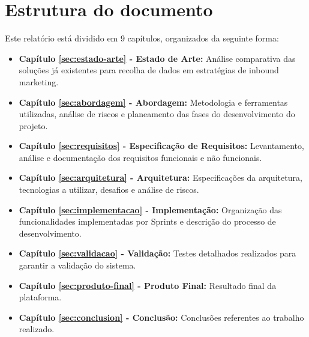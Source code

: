 \section{Estrutura do documento}
\label{subsec:estrutura}

Este relatório está dividido em 9 capítulos, organizados da seguinte forma:
\begin{itemize}
	 \item \textbf{Capítulo \ref{sec:estado-arte} - Estado de Arte: }Análise comparativa das soluções já existentes para recolha de dados em estratégias de inbound marketing.
	
	\item \textbf{Capítulo \ref{sec:abordagem} - Abordagem: }Metodologia e ferramentas utilizadas, análise de riscos e planeamento das fases do desenvolvimento do projeto.
	
	\item \textbf{Capítulo \ref{sec:requisitos} - Especificação de Requisitos: }Levantamento, análise e documentação dos requisitos funcionais e não funcionais.
	
	\item \textbf{Capítulo \ref{sec:arquitetura} - Arquitetura: }Especificações da arquitetura, tecnologias a utilizar, desafios e análise de riscos.
	
	\item \textbf{Capítulo \ref{sec:implementacao} - Implementação: }Organização das funcionalidades implementadas por Sprints e descrição do processo de desenvolvimento.
	
	\item \textbf{Capítulo \ref{sec:validacao} - Validação: }Testes detalhados realizados para garantir a validação do sistema.
	
	\item \textbf{Capítulo \ref{sec:produto-final} - Produto Final: }Resultado final da plataforma.

	\item \textbf{Capítulo \ref{sec:conclusion} - Conclusão: }Conclusões referentes ao trabalho realizado.
	
\end{itemize}



\blankpage

\glsresetall



